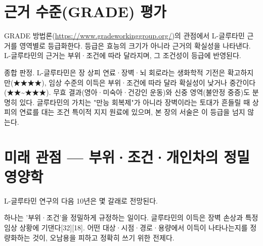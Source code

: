\documentclass[12pt,oneside]{book}
\begin{document}
\section{근거 수준(GRADE) 평가}

GRADE 방법론(\url{https://www.gradeworkinggroup.org/})의 관점에서 L-글루타민 근거를 영역별로 등급화한다. 등급은 효능의 크기가 아니라 근거의 확실성을 나타낸다. L-글루타민의 근거는 부위·조건에 따라 달라지며, 그 조건성이 등급에 반영된다.

\vspace{2pt}\vspace{3pt}

종합 판정. L-글루타민은 장 상피 연료·장벽·뇌 회로라는 생화학적 기전은 확고하지만(★★★★), 임상 수준의 이득은 부위·조건에 따라 달라 확실성이 낮거나 중간이다(★★\textasciitilde{}★★★). 무효 결과(영아·미숙아·건강인 운동)와 신중 영역(불안정 중증)도 분명히 있다. 글루타민의 가치는 "만능 회복제"가 아니라 장벽이라는 토대가 흔들릴 때 상피의 연료를 대는 조건 특이적 지지 원료에 있으며, 본 장의 서술은 이 등급을 넘지 않는다.

\section{미래 관점 — 부위·조건·개인차의 정밀 영양학}

L-글루타민 연구의 다음 10년은 몇 갈래로 전망된다.

하나는 '부위·조건'을 정밀하게 규정하는 일이다. 글루타민의 이득은 장벽 손상과 특정 임상 상황에 기댄다[32][18]. 어떤 대상·시점·경로·용량에서 이득이 나타나는지를 정량화하는 것이, 오남용을 피하고 정확히 쓰기 위한 전제다.
\end{document}

